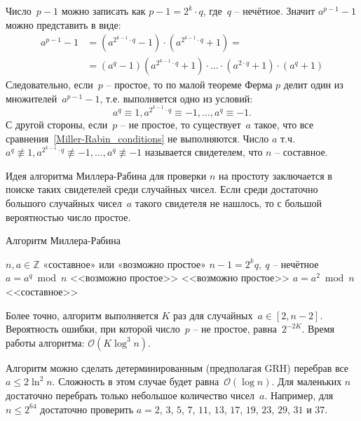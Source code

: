 \documentclass[11pt]{exam}
\theoremstyle{definition}
\newcommand*{\structure}[1]{\textcolor{struct-color}{#1}}
\begin{document}
{Число~$p-1$ можно записать как $p-1 = 2^k \cdot q$, где~$q$ -- нечётное. Значит $a^{p-1} - 1$ можно представить в виде:
\begin{equation*}
	\begin{split}
		a^{p-1} - 1 & = (a^{2^{k-1} \cdot q} - 1) \cdot (a^{2^{k-1} \cdot q} + 1) = \\&= (a^q - 1) (a^{2^{k-1} \cdot q} + 1) \cdot \ldots \cdot (a^{2 \cdot q} + 1) \cdot (a^q + 1)
	\end{split}
\end{equation*}
Следовательно, если~$p$ -- простое, то по малой теореме Ферма $p$ делит один из множителей~$a^{p-1} - 1$, т.е. выполняется одно из условий:
\begin{equation}
	\label{Miller-Rabin_conditions}
	a^q \equiv 1, a^{2^{k-1} \cdot q} \equiv -1, \ldots, a^{q} \equiv -1.
\end{equation}
С другой стороны, если~$p$ -- не простое, то существует~$a$ такое, что все сравнения~\eqref{Miller-Rabin_conditions} не выполняются. Число $a$ т.ч. $a^q \not\equiv 1, a^{2^{k-1} \cdot q} \not\equiv -1, \ldots, a^{q} \not\equiv -1$ называется \structure{свидетелем}, что $n$ -- составное.

\structure{Идея} алгоритма Миллера-Рабина для проверки $n$ на простоту заключается в поиске таких свидетелей среди случайных чисел. Если среди достаточно большого случайных чисел~$a$ такого свидетеля не нашлось, то с большой вероятностью число простое.

\begin{algorithm}
	\caption{Алгоритм Миллера-Рабина}\label{alg:miller-rabin}
	\begin{algorithmic}
		\Require $n, a\in \mathbb{Z}$
		\Ensure «составное» или «возможно простое»
		\State$n-1 = 2^kq,\ q$ -- нечётное
		\State $a = a^q\bmod n$
		\Return <<возможно простое>>
		\EndIf
		\Return <<возможно простое>>
		\EndIf
		\State $a = a^2 \bmod{n}$
		\EndFor
		\Return <<составное>>
	\end{algorithmic}
\end{algorithm}

Более точно, алгоритм выполняется $K$ раз для случайных~$a \in [2, n-2]$. Вероятность ошибки, при которой число~$p$ -- не простое, равна~$2^{-2 K}$. Время работы алгоритма: $\mathcal{O}(K \log^3{n})$.

Алгоритм можно сделать \structure{детерминированным} (предполагая GRH) перебрав все $a ≤ 2 \ln^2 n$. Сложность в этом случае будет равна~$\mathcal{O}(\log n)$. Для маленьких $n$ достаточно перебрать только небольшое количество чисел~$a$. Например, для $n \leq 2^{64}$ достаточно проверить $a = 2$, $3$, $5$, $7$, $11$, $13$, $17$, $19$, $23$, $29$, $31$ и $37$.

}
\end{document}
